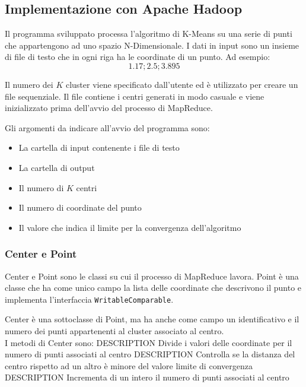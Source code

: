 \documentclass[10pt,twocolumn,letterpaper]{article}
\makeatletter
\newcommand{\DESCRIPTION@original@item}{}
\let\DESCRIPTION@original@item\item
\newcommand*{\DESCRIPTION@envir}{DESCRIPTION}
\newlength{\DESCRIPTION@totalleftmargin}
\newlength{\DESCRIPTION@linewidth}
\newcommand{\DESCRIPTION@makelabel}[1]{\llap{#1}}%
\newcommand{\DESCRIPTION@item}[1][]{%
  \setlength{\@totalleftmargin}%
       {\DESCRIPTION@totalleftmargin+\widthof{\textbf{#1 }}-\leftmargin}%
  \setlength{\linewidth}
       {\DESCRIPTION@linewidth-\widthof{\textbf{#1 }}+\leftmargin}%
  \par\parshape \@ne \@totalleftmargin \linewidth
  \DESCRIPTION@original@item[\textbf{#1}]%
}
\newenvironment{DESCRIPTION}
  {\list{}{\setlength{\labelwidth}{0cm}%
           \let\makelabel\DESCRIPTION@makelabel}%
   \setlength{\DESCRIPTION@totalleftmargin}{\@totalleftmargin}%
   \setlength{\DESCRIPTION@linewidth}{\linewidth}%
   \renewcommand{\item}{\ifx\@currenvir\DESCRIPTION@envir
                           \expandafter\DESCRIPTION@item
                        \else
                           \expandafter\DESCRIPTION@original@item
                        \fi}}
  {\endlist}
\newcommand{\code}[1]{\texttt{#1}}
\makeatother
\begin{document}
\subsection{Implementazione con Apache Hadoop}
\label{hadoop}
    Il programma sviluppato processa l'algoritmo di K-Means su una serie di punti
    che appartengono ad uno spazio N-Dimensionale. I dati in input sono
    un insieme di file di testo che in ogni riga ha le coordinate di un punto.
    Ad esempio:
    $$1.17;2.5;3.895$$

    Il numero dei $K$ cluster viene specificato dall'utente ed è utilizzato
    per creare un file sequenziale. Il file contiene i centri generati in modo casuale
    e viene inizializzato prima dell'avvio del processo di MapReduce.

    Gli argomenti da indicare all'avvio del programma sono:
    \begin{itemize}
        \renewcommand{\labelitemi}{\scriptsize$\triangleright$}
        \item La cartella di input contenente i file di testo
        \item La cartella di output
        \item Il numero di $K$ centri
        \item Il numero di coordinate del punto
        \item Il valore che indica il limite per la convergenza dell'algoritmo
    \end{itemize}
    \subsubsection{Center e Point}
        Center e Point sono le classi su cui il processo di MapReduce lavora.
        Point è una classe che ha come unico campo la lista delle coordinate che
        descrivono il punto e implementa l'interfaccia \code{WritableComparable}.

        Center è una sottoclasse di Point, ma ha anche come campo un identificativo
        e il numero dei punti appartenenti al cluster associato al centro.\\
        I metodi di Center sono:
        \begin{DESCRIPTION}
            \item [divideCoordinates] Divide i valori delle coordinate per il numero di punti associati al centro
            \item [isConverged] Controlla se la distanza del centro rispetto ad un altro è minore del valore limite di convergenza
            \item [addNumOfPoints] Incrementa di un intero il numero di punti associati al centro
        \end{DESCRIPTION}
        
\end{document}
